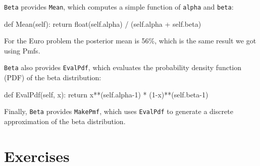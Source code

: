 \documentclass[12pt]{book}
\theoremstyle{exercise}
\begin{document}
{\tt Beta} provides {\tt Mean}, which 
computes a simple function of {\tt alpha}
and {\tt beta}:

\begin{code}
    def Mean(self):
        return float(self.alpha) / (self.alpha + self.beta)
\end{code}

For the Euro problem the posterior mean is 56\%, which is the
same result we got using Pmfs.  

{\tt Beta} also provides {\tt EvalPdf}, which evaluates
the probability density
function (PDF)  of the beta distribution:

\begin{code}
    def EvalPdf(self, x):
        return x**(self.alpha-1) * (1-x)**(self.beta-1)
\end{code}

Finally, {\tt Beta} provides {\tt MakePmf}, which
uses {\tt EvalPdf} to generate a discrete approximation
of the beta distribution.





\section{Exercises}
\end{document}
